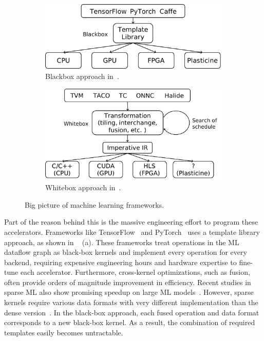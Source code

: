\begin{figure}
\centering
\begin{subfigure}[b]{0.48\textwidth}
\centering
\includegraphics[width=1\textwidth]{figs/blackbox.pdf}
\caption{
  Blackbox approach in~\cite{tensorflow,pytorch,caffe}.
}
\end{subfigure}
\hfill
\begin{subfigure}[b]{0.48\textwidth}
\centering
\includegraphics[width=1\textwidth]{figs/whitebox.pdf}
\caption{
  Whitebox approach in~\cite{tvm,taco,tc,onnc,halide}.
}
\end{subfigure}
\caption[Big picture of machine learning frameworks]{
  Big picture of machine learning frameworks.
}
\label{fig:bigpic}
\end{figure}

Part of the reason behind this is the massive engineering effort to program these accelerators.
Frameworks like TensorFlow~\cite{tensorflow} and PyTorch~\cite{caffe} uses a template library
approach, as shown in ~ (a).
These frameworks treat operations in the ML dataflow graph as black-box kernels and implement
every operation for every backend, requiring expensive engineering hours and hardware expertise to
fine-tune each accelerator.
Furthermore, cross-kernel optimizations, such as fusion, often provide orders of magnitude improvement in efficiency.
Recent studies in sparse ML also show promising speedup on large ML models~\cite{eie}. 
However, sparse kernels require various data formats with very different implementation than the dense
version~\cite{tacosparse}.
In the black-box approach, each fused operation and data format corresponds to a new black-box
kernel.
As a result, the combination of required templates easily becomes untractable.


